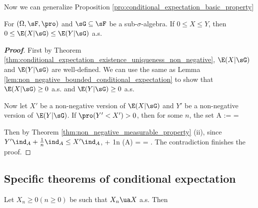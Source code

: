 Now we can generalize Proposition \ref{pro:conditional_expectation_basic_property}

\begin{proposition}\label{pro:non_negative_conditional_expectation}
For $(\Omega,\sF,\pro)$ and $\sG \subseteq \sF$ be a sub-$\sigma$-algebra. If $0\leq X\leq Y$, then $0\leq \E(X|\sG) \leq \E(Y|\sG)$ a.s.
\end{proposition}

\begin{proof}[\bf Proof]
First by Theorem \ref{thm:conditional_expectation_existence_uniqueness_non_negative}, $\E(X|\sG)$ and $\E(Y|\sG)$ are well-defined. We can use the same as Lemma \ref{lem:non_negative_bounded_conditional_expectation} to show that $\E(X|\sG)\geq 0$ a.s. and $\E(Y|\sG)\geq 0$ a.s.





Now let $X'$ be a non-negative version of $\E(X|\sG)$ and $Y'$ be a non-negative version of $\E(Y|\sG)$. If $\pro(Y'< X') >0$, then for some $n$, the set
\beast
A :=  =  \in \sG \quad{} %
\eeast

Then by Theorem \ref{thm:non_negative_measurable_property} (ii), since $Y'\ind_A + \frac 1n \ind_A \leq X'\ind_A$,
\be
\E{} + \frac 1n \pro(A) \leq \E{} = \E{} \leq \E{} = \E{}. %
\ee
The contradiction finishes the proof.
\end{proof}



\subsection{Specific theorems of conditional expectation}


\begin{theorem}\label{thm:monotone_convergence_conditional_expectation}
Let $X_n \geq 0 (n \geq 0)$ be such that $X_n \ua X$ a.s. Then
\be
\E{}\ua \E{} 
\ee
\end{theorem}

